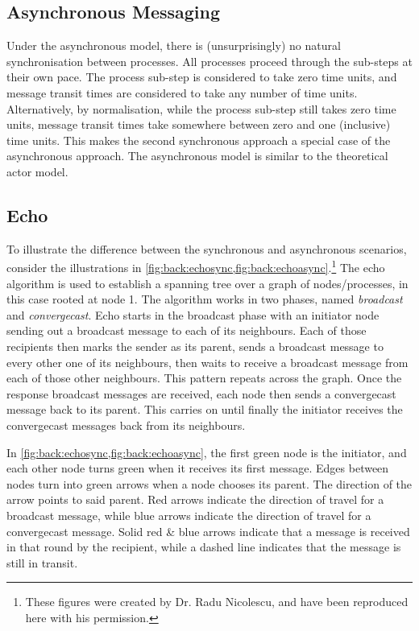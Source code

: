 \subsection{Asynchronous Messaging}
Under the asynchronous model, there is (unsurprisingly) no natural synchronisation between processes.  All processes proceed through the sub-steps at their own pace.  The \textsf{process} sub-step is considered to take zero time units, and message transit times are considered to take any number of time units.  Alternatively, by normalisation, while the \textsf{process} sub-step still takes zero time units, message transit times take somewhere between zero and one (inclusive) time units.  This makes the second synchronous approach a special case of the asynchronous approach.  The asynchronous model is similar to the theoretical \gls{actor} model.

\subsection{Echo}
To illustrate the difference between the synchronous and asynchronous scenarios, consider the illustrations in \cref{fig:back:echosync,fig:back:echoasync}.\footnote{These figures were created by Dr. Radu Nicolescu, and have been reproduced here with his permission.}  The \textsf{echo} algorithm \cite[Ch.~4.3]{Fokkink2013} is used to establish a spanning tree over a graph of nodes/processes, in this case rooted at node 1.  The algorithm works in two phases, named \emph{broadcast} and \emph{convergecast}.  \textsf{Echo} starts in the broadcast phase with an initiator node sending out a broadcast message to each of its neighbours.  Each of those recipients then marks the sender as its parent, sends a broadcast message to every other one of its neighbours, then waits to receive a broadcast message from each of those other neighbours.  This pattern repeats across the graph.  Once the response broadcast messages are received, each node then sends a convergecast message back to its parent.  This carries on until finally the initiator receives the convergecast messages back from its neighbours.

In \cref{fig:back:echosync,fig:back:echoasync}, the first green node is the initiator, and each other node turns green when it receives its first message.  Edges between nodes turn into green arrows when a node chooses its parent.  The direction of the arrow points to said parent.  Red arrows indicate the direction of travel for a broadcast message, while blue arrows indicate the direction of travel for a convergecast message.  Solid red \& blue arrows indicate that a message is received in that round by the recipient, while a dashed line indicates that the message is still in transit.

